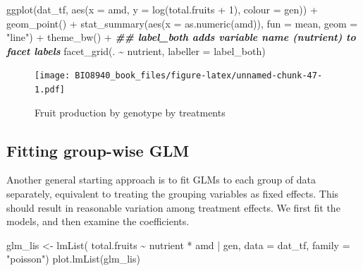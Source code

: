 \documentclass[
  12pt,
]{book}
\newenvironment{Shaded}{\begin{snugshade}}{\end{snugshade}}
\newcommand{\AttributeTok}[1]{\textcolor[rgb]{0.77,0.63,0.00}{#1}}
\newcommand{\DecValTok}[1]{\textcolor[rgb]{0.00,0.00,0.81}{#1}}
\newcommand{\DocumentationTok}[1]{\textcolor[rgb]{0.56,0.35,0.01}{\textbf{\textit{#1}}}}
\newcommand{\FunctionTok}[1]{\textcolor[rgb]{0.00,0.00,0.00}{#1}}
\newcommand{\NormalTok}[1]{#1}
\newcommand{\OtherTok}[1]{\textcolor[rgb]{0.56,0.35,0.01}{#1}}
\newcommand{\SpecialCharTok}[1]{\textcolor[rgb]{0.00,0.00,0.00}{#1}}
\newcommand{\StringTok}[1]{\textcolor[rgb]{0.31,0.60,0.02}{#1}}
\begin{document}
\begin{Shaded}
\begin{Highlighting}[]
\FunctionTok{ggplot}\NormalTok{(dat\_tf, }\FunctionTok{aes}\NormalTok{(}\AttributeTok{x =}\NormalTok{ amd, }\AttributeTok{y =} \FunctionTok{log}\NormalTok{(total.fruits }\SpecialCharTok{+} \DecValTok{1}\NormalTok{), }\AttributeTok{colour =}\NormalTok{ gen)) }\SpecialCharTok{+}
  \FunctionTok{geom\_point}\NormalTok{() }\SpecialCharTok{+}
  \FunctionTok{stat\_summary}\NormalTok{(}\FunctionTok{aes}\NormalTok{(}\AttributeTok{x =} \FunctionTok{as.numeric}\NormalTok{(amd)), }\AttributeTok{fun =}\NormalTok{ mean, }\AttributeTok{geom =} \StringTok{"line"}\NormalTok{) }\SpecialCharTok{+}
  \FunctionTok{theme\_bw}\NormalTok{() }\SpecialCharTok{+}
  \DocumentationTok{\#\# label\_both adds variable name (\textquotesingle{}nutrient\textquotesingle{}) to facet labels}
  \FunctionTok{facet\_grid}\NormalTok{(. }\SpecialCharTok{\textasciitilde{}}\NormalTok{ nutrient, }\AttributeTok{labeller =}\NormalTok{ label\_both)}
\end{Highlighting}
\end{Shaded}

\begin{figure}
\centering
\texttt{[image: BIO8940\_book\_files/figure-latex/unnamed-chunk-47-1.pdf]}
\caption{\label{fig:unnamed-chunk-47}Fruit production by genotype by treatments}
\end{figure}

\hypertarget{fitting-group-wise-glm}{%
\subsection{Fitting group-wise GLM}\label{fitting-group-wise-glm}}

Another general starting approach is to fit GLMs to each group of data separately, equivalent to treating the grouping variables as fixed effects.
This should result in reasonable variation among treatment effects. We first fit the models, and then examine the coefficients.

\begin{Shaded}
\begin{Highlighting}[]
\NormalTok{glm\_lis }\OtherTok{\textless{}{-}} \FunctionTok{lmList}\NormalTok{(}
\NormalTok{  total.fruits }\SpecialCharTok{\textasciitilde{}}\NormalTok{ nutrient }\SpecialCharTok{*}\NormalTok{ amd }\SpecialCharTok{|}\NormalTok{ gen,}
  \AttributeTok{data =}\NormalTok{ dat\_tf,}
  \AttributeTok{family =} \StringTok{"poisson"}\NormalTok{)}
\FunctionTok{plot.lmList}\NormalTok{(glm\_lis)}
\end{Highlighting}
\end{Shaded}
\end{document}
